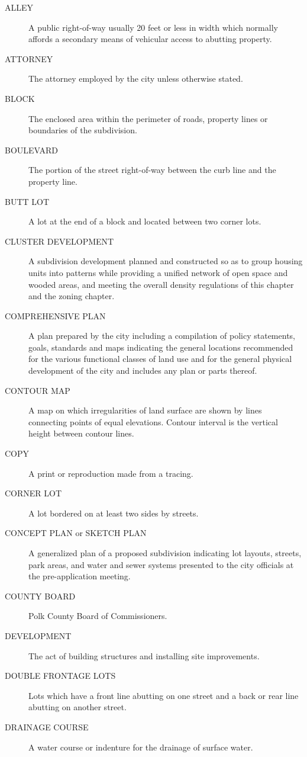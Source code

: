 \begin{description}
    \item[ALLEY] A public right-of-way usually 20 feet or less in width which normally affords a secondary means of vehicular access to abutting property.
    \item[ATTORNEY] The attorney employed by the city unless otherwise stated.
    \item[BLOCK] The enclosed area within the perimeter of roads, property lines or boundaries of the subdivision.
    \item[BOULEVARD] The portion of the street right-of-way between the curb line and the property line.
    \item[BUTT LOT] A lot at the end of a block and located between two corner lots.
    \item[CLUSTER DEVELOPMENT] A subdivision development planned and constructed so as to group housing units into patterns while providing a unified network of open space and wooded areas, and meeting the overall density regulations of this chapter and the zoning chapter.
    \item[COMPREHENSIVE PLAN] A plan prepared by the city including a compilation of policy statements, goals, standards and maps indicating the general locations recommended for the various functional classes of land use and for the general physical development of the city and includes any plan or parts thereof.
    \item[CONTOUR MAP] A map on which irregularities of land surface are shown by lines connecting points of equal elevations. Contour interval is the vertical height between contour lines.
    \item[COPY] A print or reproduction made from a tracing.
    \item[CORNER LOT] A lot bordered on at least two sides by streets.
    \item[CONCEPT PLAN or SKETCH PLAN] A generalized plan of a proposed subdivision indicating lot layouts, streets, park areas, and water and sewer systems presented to the city officials at the pre-application meeting.
    \item[COUNTY BOARD] Polk County Board of Commissioners.
    \item[DEVELOPMENT] The act of building structures and installing site improvements.
    \item[DOUBLE FRONTAGE LOTS] Lots which have a front line abutting on one street and a back or rear line abutting on another street.
    \item[DRAINAGE COURSE] A water course or indenture for the drainage of surface water.

\end{description}
